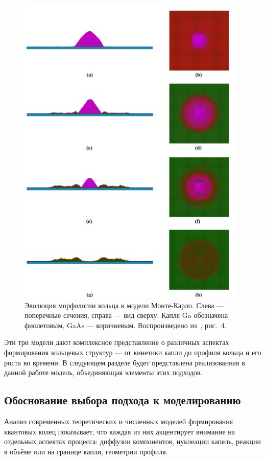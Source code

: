 \documentclass[14pt,oneside]{extarticle}
\begin{document}
\begin{figure}
    \begin{center}
        \includegraphics[width=11cm]{images/shwartz_fig4.jpg}
        \caption{\label{fig:shwartz4}
            Эволюция морфологии кольца в модели Монте-Карло. Слева — поперечные сечения, справа — вид сверху. Капля Ga обозначена фиолетовым, GaAs — коричневым. Воспроизведено из~\cite{shwartz2018}, рис.~4.}
    \end{center}
\end{figure}

\vspace{0.5em}
Эти три модели дают комплексное представление о различных аспектах формирования кольцевых структур — от кинетики капли до профиля кольца и его роста во времени. В следующем разделе будет представлена реализованная в данной работе модель, объединяющая элементы этих подходов.

\subsection{Обоснование выбора подхода к моделированию}

Анализ современных теоретических и численных моделей формирования квантовых колец показывает, что каждая из них акцентирует внимание на отдельных аспектах процесса: диффузии компонентов, нуклеации капель, реакции в объёме или на границе капли, геометрии профиля.
\end{document}
